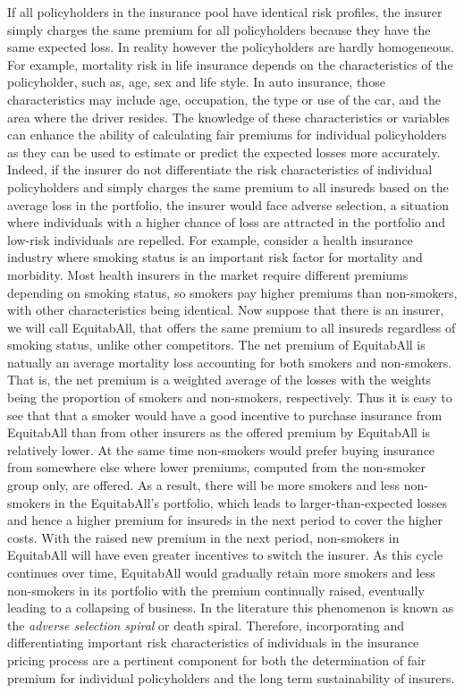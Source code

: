 \documentclass[12pt]{article}
\begin{document}
If all policyholders in the insurance pool have identical risk profiles, the insurer simply charges the same premium for all  policyholders because they have the same expected loss. In reality however the policyholders are hardly homogeneous. For example, mortality risk in life insurance depends on the characteristics of the policyholder, such as, age, sex and life style. In auto insurance, those characteristics may include age, occupation, the type or use of the car, and the area where the driver resides. The knowledge of these characteristics or variables can enhance the ability of calculating fair premiums for individual policyholders as they can be used to estimate or predict the expected losses more accurately.\\

 Indeed, if the insurer do not differentiate the risk characteristics of individual policyholders and simply charges the same premium to all insureds based on the average loss in the portfolio, the insurer would face adverse selection, a situation where individuals with a higher chance of loss are attracted in the portfolio and low-risk individuals are repelled. For example, consider a health insurance industry where smoking status is an important risk factor for mortality and morbidity. Most health insurers in the market require different premiums depending on smoking status, so smokers pay higher premiums than non-smokers, with other characteristics being identical. Now suppose that there is an insurer, we will call EquitabAll, that offers the same premium to all insureds regardless of smoking status, unlike other competitors. The net premium of EquitabAll is natually an average mortality loss accounting for both smokers and non-smokers. That is, the net premium is a weighted average of the losses with the weights being the proportion of smokers and non-smokers, respectively. Thus it is easy to see that that a smoker would have a good incentive to purchase insurance from EquitabAll than from other insurers as the offered premium by EquitabAll is relatively lower. At the same time non-smokers would prefer buying insurance from somewhere else where lower premiums, computed from the non-smoker group only, are offered. As a result,  there will be more smokers and less non-smokers in the EquitabAll's portfolio, which leads to larger-than-expected losses and hence a higher premium for insureds in the next period to cover the higher costs. With the raised new premium in the next period, non-smokers in EquitabAll will have even greater incentives to switch the insurer. As this cycle continues  over time, EquitabAll would gradually retain more smokers and less non-smokers in its portfolio with the premium continually raised, eventually leading to a collapsing of business. In the literature this phenomenon is known as the \textit{adverse selection spiral} or death spiral. Therefore, incorporating and differentiating important risk characteristics of individuals in the insurance pricing process are a pertinent component for both the determination of fair premium for individual  policyholders and the long term sustainability of insurers.\\
\end{document}
